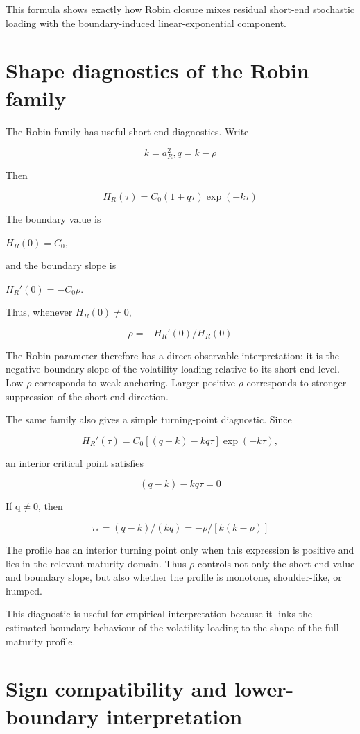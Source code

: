 \documentclass[11pt,oneside]{book}
\begin{document}
This formula shows exactly how Robin closure mixes residual short-end
stochastic loading with the boundary-induced linear-exponential
component.

\section{Shape diagnostics of the Robin
family}\label{shape-diagnostics-of-the-robin-family}

The Robin family has useful short-end diagnostics. Write

\[
k = a_R^2, q = k - \rho
\]

Then

\[
H_R(\tau) = C_0(1 + q\tau) \exp(-k\tau)
\]

The boundary value is

$H_R(0)=C_0$,

and the boundary slope is

$H_R'(0)=-C_0\rho$.

Thus, whenever $H_R(0)\neq0$,

\[
\rho = -H_R'(0) / H_R(0)
\]

The Robin parameter therefore has a direct observable interpretation: it
is the negative boundary slope of the volatility loading relative to its
short-end level. Low $\rho$ corresponds to weak anchoring. Larger positive $\rho$
corresponds to stronger suppression of the short-end direction.

The same family also gives a simple turning-point diagnostic. Since

\[
H_R'(\tau) = C_0[(q - k) - kq\tau] \exp(-k\tau),
\]

an interior critical point satisfies

\[
(q - k) - kq\tau = 0
\]

If q$\neq$0, then

\[
\tau_* = (q - k)/(kq) = -\rho/[k(k - \rho)]
\]

The profile has an interior turning point only when this expression is
positive and lies in the relevant maturity domain. Thus $\rho$ controls not
only the short-end value and boundary slope, but also whether the
profile is monotone, shoulder-like, or humped.

This diagnostic is useful for empirical interpretation because it links
the estimated boundary behaviour of the volatility loading to the shape
of the full maturity profile.

\section{Sign compatibility and lower-boundary
interpretation}\label{sign-compatibility-and-lower-boundary-interpretation}
\end{document}
